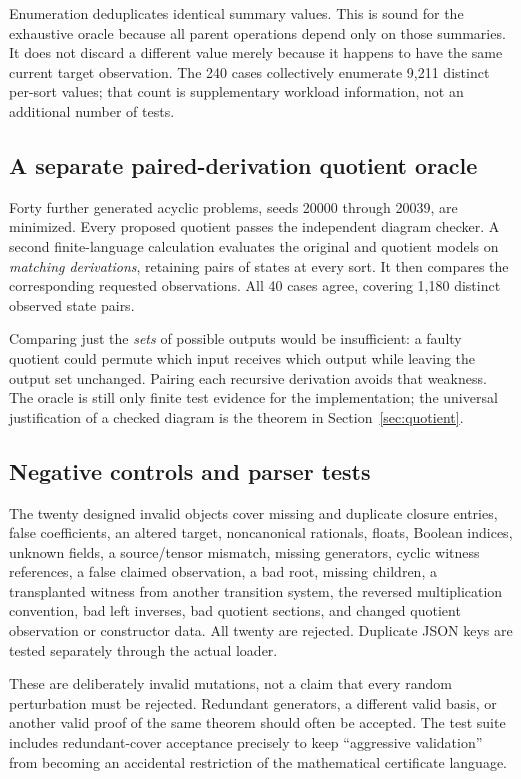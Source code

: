 \documentclass[11pt,letterpaper]{article}
\theoremstyle{definition}\newtheorem{definition}[theorem]{Definition}
\theoremstyle{remark}\newtheorem{remark}[theorem]{Remark}
\begin{document}
Enumeration deduplicates identical summary values. This is sound for the exhaustive oracle because all parent operations depend only on those summaries. It does not discard a different value merely because it happens to have the same current target observation. The 240 cases collectively enumerate 9,211 distinct per-sort values; that count is supplementary workload information, not an additional number of tests.

\subsection{A separate paired-derivation quotient oracle}
Forty further generated acyclic problems, seeds 20000 through 20039, are minimized. Every proposed quotient passes the independent diagram checker. A second finite-language calculation evaluates the original and quotient models on \emph{matching derivations}, retaining pairs of states at every sort. It then compares the corresponding requested observations. All 40 cases agree, covering 1,180 distinct observed state pairs.

Comparing just the \emph{sets} of possible outputs would be insufficient: a faulty quotient could permute which input receives which output while leaving the output set unchanged. Pairing each recursive derivation avoids that weakness. The oracle is still only finite test evidence for the implementation; the universal justification of a checked diagram is the theorem in Section~\ref{sec:quotient}.

\subsection{Negative controls and parser tests}
The twenty designed invalid objects cover missing and duplicate closure entries, false coefficients, an altered target, noncanonical rationals, floats, Boolean indices, unknown fields, a source/tensor mismatch, missing generators, cyclic witness references, a false claimed observation, a bad root, missing children, a transplanted witness from another transition system, the reversed multiplication convention, bad left inverses, bad quotient sections, and changed quotient observation or constructor data. All twenty are rejected. Duplicate JSON keys are tested separately through the actual loader.

These are deliberately invalid mutations, not a claim that every random perturbation must be rejected. Redundant generators, a different valid basis, or another valid proof of the same theorem should often be accepted. The test suite includes redundant-cover acceptance precisely to keep ``aggressive validation'' from becoming an accidental restriction of the mathematical certificate language.
\end{document}
